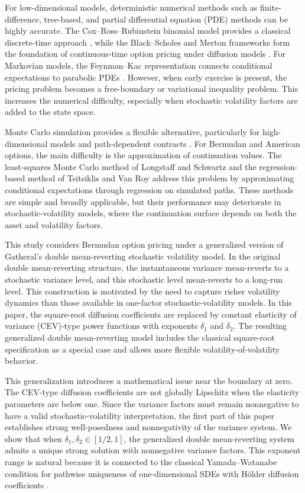 \documentclass[10pt]{article}
\theoremstyle{plain}
\theoremstyle{definition}
\theoremstyle{remark}
\begin{document}
For low-dimensional models, deterministic numerical methods such as finite-difference, tree-based, and partial differential equation (PDE) methods can be highly accurate. The Cox--Ross--Rubinstein binomial model provides a classical discrete-time approach \citep{cox1979option}, while the Black--Scholes and Merton frameworks form the foundation of continuous-time option pricing under diffusion models \citep{black1973pricing,merton1973theory}. For Markovian models, the Feynman--Kac representation connects conditional expectations to parabolic PDEs \citep{karatzas1991brownian}. However, when early exercise is present, the pricing problem becomes a free-boundary or variational inequality problem. This increases the numerical difficulty, especially when stochastic volatility factors are added to the state space.

Monte Carlo simulation provides a flexible alternative, particularly for high-dimensional models and path-dependent contracts \citep{glasserman2004montecarlo}. For Bermudan and American options, the main difficulty is the approximation of continuation values. The least-squares Monte Carlo method of Longstaff and Schwartz \citep{longstaff2001valuing} and the regression-based method of Tsitsiklis and Van Roy \citep{tsitsiklis2001regression} address this problem by approximating conditional expectations through regression on simulated paths. These methods are simple and broadly applicable, but their performance may deteriorate in stochastic-volatility models, where the continuation surface depends on both the asset and volatility factors.

This study considers Bermudan option pricing under a generalized version of Gatheral's double mean-reverting stochastic volatility model. In the original double mean-reverting structure, the instantaneous variance mean-reverts to a stochastic variance level, and this stochastic level mean-reverts to a long-run level. This construction is motivated by the need to capture richer volatility dynamics than those available in one-factor stochastic-volatility models. In this paper, the square-root diffusion coefficients are replaced by constant elasticity of variance (CEV)-type power functions with exponents $\delta_1$ and $\delta_2$. The resulting generalized double mean-reverting model includes the classical square-root specification as a special case and allows more flexible volatility-of-volatility behavior.

This generalization introduces a mathematical issue near the boundary at zero. The CEV-type diffusion coefficients are not globally Lipschitz when the elasticity parameters are below one. Since the variance factors must remain nonnegative to have a valid stochastic-volatility interpretation, the first part of this paper establishes strong well-posedness and nonnegativity of the variance system. We show that when $\delta_1,\delta_2\in[1/2,1]$, the generalized double mean-reverting system admits a unique strong solution with nonnegative variance factors. This exponent range is natural because it is connected to the classical Yamada--Watanabe condition for pathwise uniqueness of one-dimensional SDEs with H\"older diffusion coefficients \citep{yamada1971uniqueness}.
\end{document}
